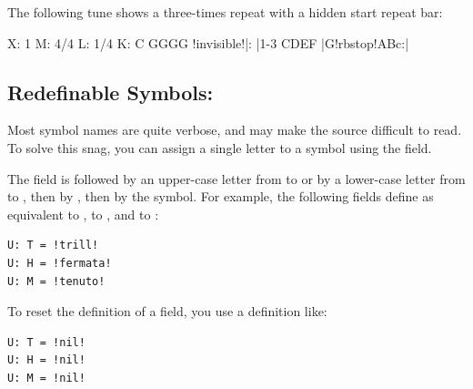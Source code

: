\documentclass[a4paper,fullpage,12pt]{book}
\begin{document}
The following tune shows a three-times repeat with a hidden start
repeat bar:

\begin{abcsource}
X: 1
M: 4/4
L: 1/4
K: C
GGGG !invisible!|: |1-3 CDEF |G!rbstop!ABc:|
\end{abcsource}


  
  
  


\subsection{Redefinable Symbols: }

Most symbol names are quite verbose, and may make the source difficult
to read. To solve this snag, you can assign a single letter to a
symbol using the  field.

The field is followed by an upper-case letter from  to 
or by a lower-case letter from  to , then by \car{=},
then by the symbol. For example, the following  fields
define  as equivalent to ,  to
, and  to :

\begin{verbatim}
U: T = !trill!
U: H = !fermata!
U: M = !tenuto!
\end{verbatim}


To reset the definition of a  field, you use a definition
like:

\begin{verbatim}
U: T = !nil!
U: H = !nil!
U: M = !nil!
\end{verbatim}

\end{document}

